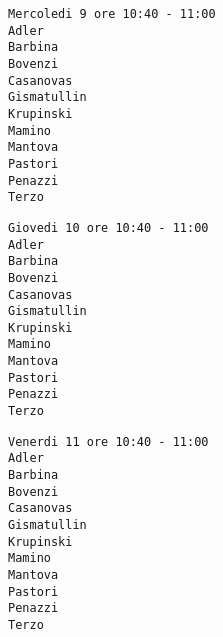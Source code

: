 \documentclass[12pt,a4paper]{article}
\begin{document}

\begin{Verbatim}[baselinestretch=4]
Mercoledi 9 ore 10:40 - 11:00
Adler
Barbina
Bovenzi
Casanovas
Gismatullin
Krupinski 
Mamino
Mantova
Pastori
Penazzi
Terzo
\end{Verbatim}
\clearpage
\begin{Verbatim}[baselinestretch=4]
Giovedi 10 ore 10:40 - 11:00
Adler
Barbina
Bovenzi
Casanovas
Gismatullin
Krupinski 
Mamino
Mantova
Pastori
Penazzi
Terzo
\end{Verbatim}
\clearpage
\begin{Verbatim}[baselinestretch=4]
Venerdi 11 ore 10:40 - 11:00
Adler
Barbina
Bovenzi
Casanovas
Gismatullin
Krupinski 
Mamino
Mantova
Pastori
Penazzi
Terzo
\end{Verbatim}
\end{document}
